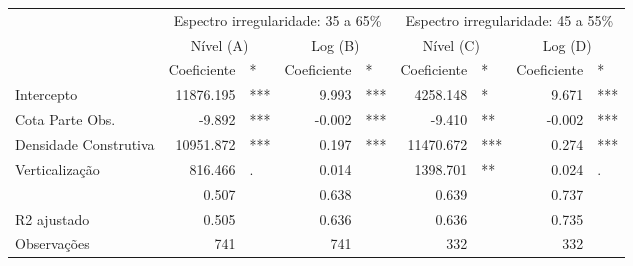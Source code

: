 \begingroup
\fontsize{7.5pt}{9.0pt}\selectfont
\begin{longtable}{lrlrlrlrl}
\toprule
 & \multicolumn{4}{c}{Espectro irregularidade: 35 a 65\%} & \multicolumn{4}{c}{Espectro irregularidade: 45 a 55\%} \\ 
\cmidrule(lr){2-5} \cmidrule(lr){6-9}
 & \multicolumn{2}{c}{Nível (A)    } & \multicolumn{2}{c}{Log (B)    } & \multicolumn{2}{c}{Nível (C)    } & \multicolumn{2}{c}{Log (D)    } \\ 
\cmidrule(lr){2-3} \cmidrule(lr){4-5} \cmidrule(lr){6-7} \cmidrule(lr){8-9}
  & Coeficiente & * & Coeficiente  & *  & Coeficiente   & *   & Coeficiente    & *    \\ 
\midrule\addlinespace[2.5pt]
Intercepto & 11876.195 & *** & 9.993 & *** & 4258.148 & * & 9.671 & *** \\ 
Cota Parte Obs. & -9.892 & *** & -0.002 & *** & -9.410 & ** & -0.002 & *** \\ 
Densidade Construtiva & 10951.872 & *** & 0.197 & *** & 11470.672 & *** & 0.274 & *** \\ 
Verticalização & 816.466 & . & 0.014 &  & 1398.701 & ** & 0.024 & . \\ 
\midrule\addlinespace[2.5pt]
{R2} & {0.507} & {} & {0.638} & {} & {0.639} & {} & {0.737} & {} \\ 
R2 ajustado & 0.505 &  & 0.636 &  & 0.636 &  & 0.735 &  \\ 
Observações & 741 &  & 741 &  & 332 &  & 332 &  \\ 
\bottomrule
\end{longtable}
\endgroup

